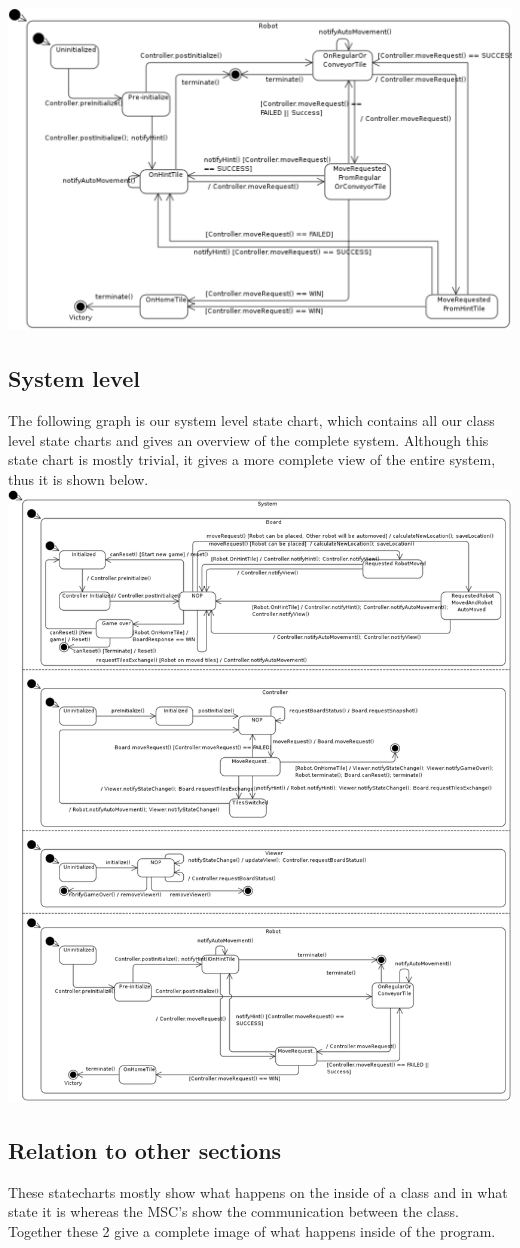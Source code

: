 	\includegraphics[width=\linewidth]{statecharts/robot.pdf}

\subsection{System level}
	The following graph is our system level state chart, which contains all our class level state charts and gives an overview of the complete system. Although this state chart is mostly trivial, it gives a more complete view of the entire system, thus it is shown below.\\

	\includegraphics[width=\linewidth]{statecharts/system.pdf}

\subsection{Relation to other sections}
    These statecharts mostly show what happens on the inside of a class and in what state it is whereas the MSC's show the communication between the class. Together these 2 give a complete image of what happens inside of the program.\\
	
